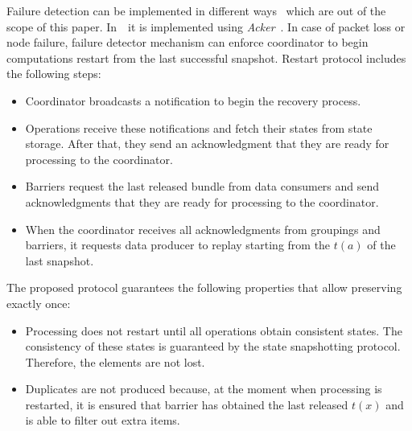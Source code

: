 Failure detection can be implemented in different ways~\cite{hayashibara2002failure} which are out of the scope of this paper. In~\FlameStream\ it is implemented using {\em Acker}~\cite{we2018adbis}. In case of packet loss or node failure, failure detector mechanism can enforce coordinator to begin computations restart from the last successful snapshot. Restart protocol includes the following steps:

\begin{itemize}
    \item Coordinator broadcasts a notification to begin the recovery process.
    \item Operations receive these notifications and fetch their states from state storage. After that, they send an acknowledgment that they are ready for processing to the coordinator.
    \item Barriers request the last released bundle from data consumers and send acknowledgments that they are ready for processing to the coordinator.
    \item When the coordinator receives all acknowledgments from groupings and barriers, it requests data producer to replay starting from the $t(a)$ of the last snapshot.
\end{itemize}

The proposed protocol guarantees the following properties that allow preserving exactly once:

\begin{itemize}
    \item Processing does not restart until all operations obtain consistent states. The consistency of these states is guaranteed by the state snapshotting protocol. Therefore, the elements are not lost.
    \item Duplicates are not produced because, at the moment when processing is restarted, it is ensured that barrier has obtained the last released $t(x)$ and is able to filter out extra items.
\end{itemize}